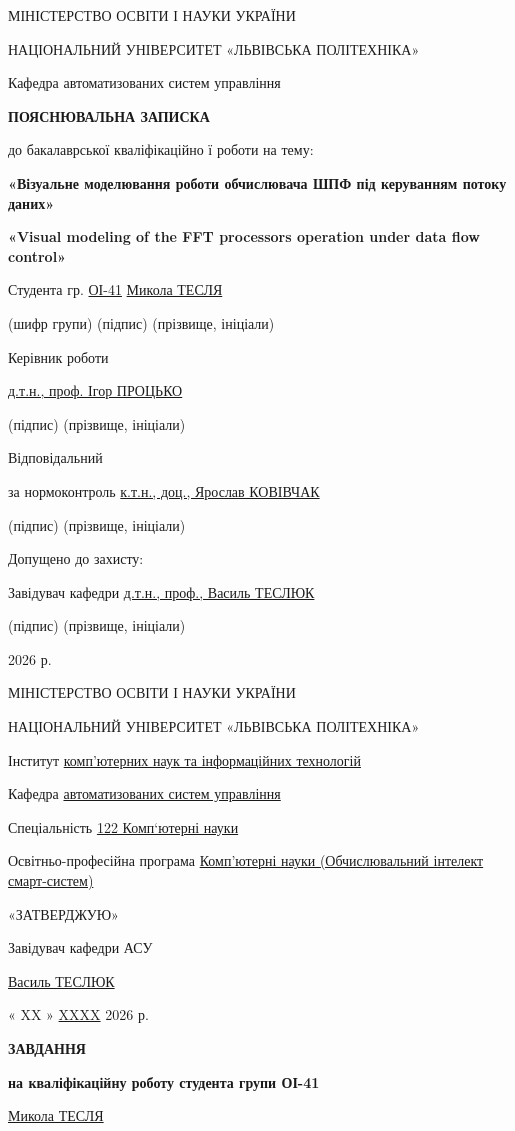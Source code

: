 \documentclass[
]{article}
\author{}
\date{}
\begin{document}
МІНІСТЕРСТВО ОСВІТИ І НАУКИ УКРАЇНИ

НАЦІОНАЛЬНИЙ УНІВЕРСИТЕТ «ЛЬВІВСЬКА ПОЛІТЕХНІКА»

Кафедра автоматизованих систем управління

\textbf{ПОЯСНЮВАЛЬНА ЗАПИСКА}

до бакалаврської кваліфікаційно ї роботи на тему:

\textbf{«Візуальне моделювання роботи обчислювача ШПФ під керуванням
потоку даних»}

\textbf{«Visual modeling of the FFT processor\textquotesingle s
operation under data flow control»}

Студента гр. \ul{ОІ-41} \ul{Микола ТЕСЛЯ}

(шифр групи) (підпис) (прізвище, ініціали)

Керівник роботи

\ul{д.т.н., проф. Ігор ПРОЦЬКО}

(підпис) (прізвище, ініціали)

Відповідальний

за нормоконтроль \ul{к.т.н., доц., Ярослав КОВІВЧАК}

(підпис) (прізвище, ініціали)

Допущено до захисту:

Завідувач кафедри \ul{д.т.н., проф., Василь ТЕСЛЮК}

(підпис) (прізвище, ініціали)

2026 р.

МІНІСТЕРСТВО ОСВІТИ І НАУКИ УКРАЇНИ

НАЦІОНАЛЬНИЙ УНІВЕРСИТЕТ «ЛЬВІВСЬКА ПОЛІТЕХНІКА»

Інститут \ul{комп'ютерних наук та інформаційних технологій}

Кафедра \ul{автоматизованих систем управління}

Спеціальність \ul{122 Комп`ютерні науки}

Освітньо-професійна програма \ul{Комп'ютерні науки (Обчислювальний
інтелект смарт-систем)}

«ЗАТВЕРДЖУЮ»

Завідувач кафедри АСУ

\ul{Василь ТЕСЛЮК}

« XX » \ul{XXXX} 2026 р.

\textbf{ЗАВДАННЯ}

\textbf{на кваліфікаційну роботу студента групи ОІ-41}

\ul{Микола ТЕСЛЯ}
\end{document}
